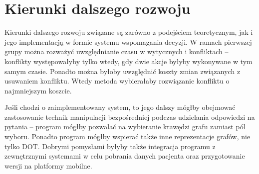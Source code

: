 \section{Kierunki dalszego rozwoju}


Kierunki dalszego rozwoju związane są zarówno z podejściem teoretycznym, jak i jego implementacją w formie systemu wspomagania decyzji. W ramach pierwszej grupy można rozważyć uwzględnianie czasu w wytycznych i konfliktach -- konflikty występowałyby tylko wtedy, gdy dwie akcje byłyby wykonywane w tym samym czasie. Ponadto można byłoby uwzględnić koszty zmian związanych z usuwaniem konfliktu. Wtedy metoda wybierałaby rozwiązanie konfliktu o najmniejszym koszcie. 

Jeśli chodzi o zaimplementowany system, to jego dalszy mógłby obejmować zastosowanie technik manipulacji bezpośredniej podczas udzielania odpowiedzi na pytania -- program mógłby pozwalać na wybieranie krawędzi grafu zamiast pól wyboru. Ponadto program mógłby wspierać także inne reprezentacje grafów, nie tylko DOT. Dobrymi pomysłami byłyby także integracja programu z zewnętrznymi systemami w celu pobrania danych pacjenta oraz przygotowanie wersji na platformy mobilne.


